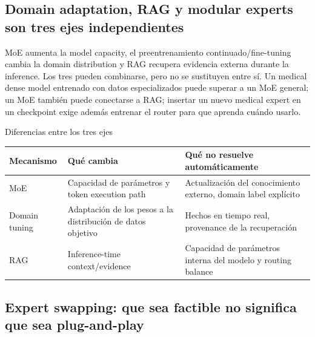 
\subsection{Domain adaptation, RAG y modular experts son tres ejes independientes}

MoE aumenta la model capacity, el preentrenamiento continuado/fine-tuning cambia la domain distribution y RAG recupera evidencia externa durante la inference. Los tres pueden combinarse, pero no se sustituyen entre sí. Un medical dense model entrenado con datos especializados puede superar a un MoE general; un MoE también puede conectarse a RAG; insertar un nuevo medical expert en un checkpoint exige además entrenar el router para que aprenda cuándo usarlo.

\begin{knowledgebox}{Diferencias entre los tres ejes}
\begin{tabularx}{\textwidth}{L{0.18\textwidth} L{0.27\textwidth} X}
\toprule
Mecanismo & Qué cambia & Qué no resuelve automáticamente \\
\midrule
MoE & Capacidad de parámetros y token execution path & Actualización del conocimiento externo, domain label explícito \\
Domain tuning & Adaptación de los pesos a la distribución de datos objetivo & Hechos en tiempo real, provenance de la recuperación \\
RAG & Inference-time context/evidence & Capacidad de parámetros interna del modelo y routing balance \\
\bottomrule
\end{tabularx}
\end{knowledgebox}


\subsection{Expert swapping: que sea factible no significa que sea plug-and-play}

